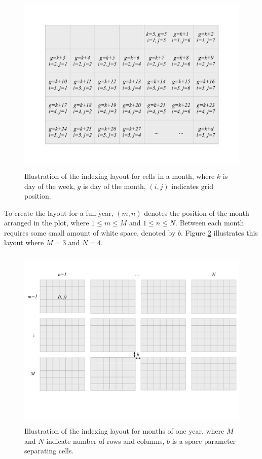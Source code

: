 \documentclass[12pt]{article}
\begin{document}
\begin{figure}

{\centering \includegraphics[width=360pt,height=250pt]{img/month} 

}

\caption{Illustration of the indexing layout for cells in a month, where $k$ is day of the week, $g$ is day of the month, $(i, j)$ indicates grid position.}\label{fig:month-diagram}
\end{figure}

To create the layout for a full year, \((m, n)\) denotes the position of
the month arranged in the plot, where \(1 \le m \le M\) and
\(1 \le n \le N\). Between each month requires some small amount of
white space, denoted by \(b\). Figure \ref{fig:year-diagram} illustrates
this layout where \(M = 3\) and \(N = 4\).

\begin{figure}

{\centering \includegraphics[width=360pt,height=250pt]{img/year-diagram} 

}

\caption{Illustration of the indexing layout for months of one year, where $M$ and $N$ indicate number of rows and columns, $b$ is a space parameter separating cells.}\label{fig:year-diagram}
\end{figure}
\end{document}
